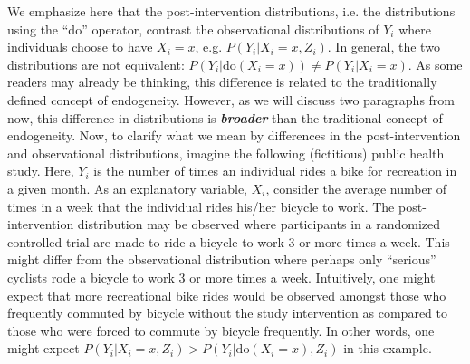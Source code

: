 We emphasize here that the post-intervention distributions, i.e. the distributions using the ``do'' operator, contrast the observational distributions of $Y_i$ where individuals choose to have $X_i = x$, e.g. $P \left( Y_i | X_i = x, Z_i \right)$. In general, the two distributions are not equivalent: $P \left( Y_i | \textrm{do} \left( X_i = x \right) \right) \neq P \left( Y_i | X_i = x \right)$. As some readers may already be thinking, this difference is related to the traditionally defined concept of endogeneity. However, as we will discuss two paragraphs from now, this difference in distributions is \textbf{\textit{broader}} than the traditional concept of endogeneity. Now, to clarify what we mean by differences in the post-intervention and observational distributions, imagine the following (fictitious) public health study. Here, $Y_i$ is the number of times an individual rides a bike for recreation in a given month. As an explanatory variable, $X_i$, consider the average number of times in a week that the individual rides his/her bicycle to work. The post-intervention distribution may be observed where participants in a randomized controlled trial are made to ride a bicycle to work 3 or more times a week. This might differ from the observational distribution where perhaps only ``serious'' cyclists rode a bicycle to work 3 or more times a week. Intuitively, one might expect that more recreational bike rides would be observed amongst those who frequently commuted by bicycle without the study intervention as compared to those who were forced to commute by bicycle frequently. In other words, one might expect $P \left( Y_i | X_i = x, Z_i \right) > P \left( Y_i | \textrm{do} \left( X_i = x \right), Z_i \right)$ in this example.

